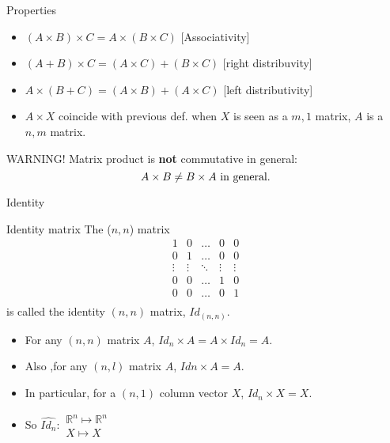 \documentclass{beamer}
\begin{document}
\begin{frame}{Properties}
  \begin{itemize}
  \item $(A \times B) \times C = A \times (B \times C)$ [Associativity]
  \item $(A + B) \times C = (A \times C) + (B \times C)$ [right distribuvity]
  \item $A \times (B + C) = (A \times B) + (A \times C)$ [left distributivity]
  \item $A \times X$ coincide with previous def. when $X$ is seen as a $m, 1$ matrix, $A$ is a $n,m$ matrix.
  \end{itemize}

  \begin{alertblock}{WARNING!}
    Matrix product is {\bf not} commutative in general:
    \[ A \times B \neq B \times A \textnormal{ in general.}\] 
  \end{alertblock}
\end{frame}

\begin{frame}{Identity}
  \begin{block}{Identity matrix}
    The ($n,n$) matrix
    \[ \begin{array}{|ccccc|}
      1 & 0 & \dots & 0 &0\\
      0 & 1 &   \dots &0 & 0\\
      \vdots  & \vdots & \ddots & \vdots & \vdots\\
      0 & 0  & \dots & 1 & 0\\
      0 & 0  & \dots & 0 & 1\\
      \end{array}
      \]  is called the identity $(n,n)$ matrix, $Id_{(n,n)}$.  
  \end{block}
  

  \begin{itemize}
  \item For any $(n,n)$ matrix $A$, $Id_{n} \times A = A \times Id_{n} = A$.
  \item Also ,for any $(n,l)$ matrix $A$, $Id{n} \times A = A$.
  \item In particular, for a $(n,1)$ column vector $X$, $Id_{n} \times X = X$.
  \item So $\widehat{Id_{n}}: \begin{array}{l} \mathbb{R}^n \mapsto \mathbb{R}^n \\ X \mapsto X \end{array}$
  \end{itemize}
  
\end{frame}
\end{document}

